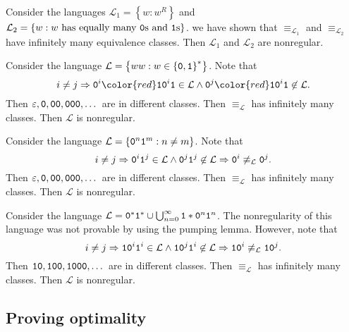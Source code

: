 \documentclass{notes}
\begin{document}
\begin{eg}
  Consider the languages $\mathcal L_1 = \left \{ w : w^R \right \}$ and $\mathcal L_2 = \left \{ w : \text{$w$ has equally many \verb~0~s and \verb~1~s} \right \}$.
  we have shown that $\equiv_{\mathcal L_1}$ and $\equiv_{\mathcal L_2}$ have infinitely many equivalence classes.
  Then $\mathcal L_1$ and $\mathcal L_2$ are nonregular.
\end{eg}

\newpage

\begin{eg}
  Consider the language $\mathcal L = \left \{ ww : w \in \left \{ \verb~0~, \verb~1~ \right \}^* \right \}$.
  Note that 
  \[
    i \neq j \Rightarrow \verb~0~^i {\color{red} \verb~10~^i \verb~1~} \in \mathcal L \land \verb~0~^j {\color{red} \verb~10~^i \verb~1~} \not \in \mathcal L.
  \]
  Then $\varepsilon, \verb~0~, \verb~00~, \verb~000~, \dots$ are in different classes.
  Then $\equiv_\mathcal L$ has infinitely many classes.
  Then $\mathcal L$ is nonregular.
\end{eg}

\begin{eg}
  Consider the language $\mathcal L = \left \{ \verb~0~^n \verb~1~^m : n \neq m \right \}$.
  Note that 
  \[
    i \neq j \Rightarrow \verb~0~^i \verb~1~^j \in \mathcal L \land \verb~0~^j \verb~1~^j \not \in \mathcal L \Rightarrow \verb~0~^i \not \equiv_\mathcal L \verb~0~^j.
  \]
  Then $\varepsilon, \verb~0~, \verb~00~, \verb~000~, \dots$ are in different classes.
  Then $\equiv_\mathcal L$ has infinitely many classes.
  Then $\mathcal L$ is nonregular.
\end{eg}

\begin{eg}
  Consider the language $\mathcal L = \verb~0~^* \verb~1~^* \cup \bigcup_{n = 0}^\infty \verb~1~* \verb~0~^n \verb~1~^n$.
  The nonregularity of this language was not provable by using the pumping lemma.
  However, note that 
  \[
    i \neq j \Rightarrow \verb~10~^i \verb~1~^i \in \mathcal L \land \verb~10~^j \verb~1~^i \not \in \mathcal L \Rightarrow \verb~10~^i \not \equiv_\mathcal L \verb~10~^j.
  \]
  Then $\verb~10~, \verb~100~, \verb~1000~, \dots$ are in different classes.
  Then $\equiv_\mathcal L$ has infinitely many classes.
  Then $\mathcal L$ is nonregular.
\end{eg}

\subsection{Proving optimality}
\end{document}
